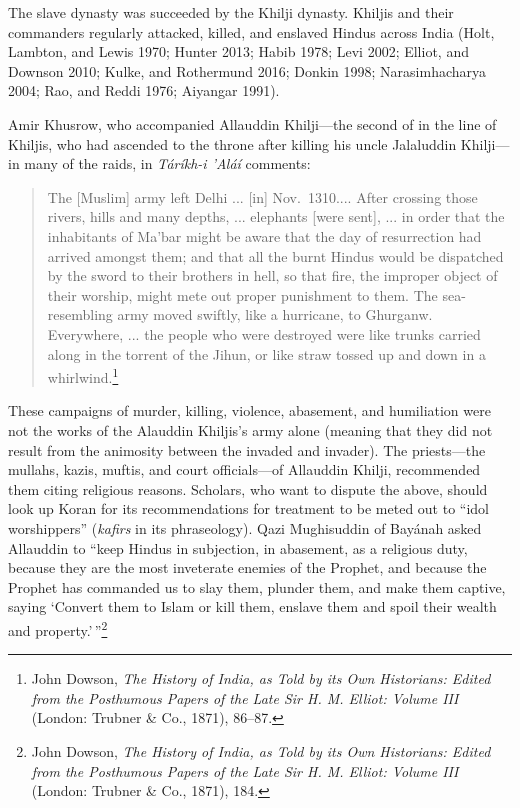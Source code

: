 The slave dynasty was succeeded by the Khilji dynasty. Khiljis and their commanders regularly attacked, killed, and enslaved Hindus across India (Holt, Lambton, and Lewis 1970; Hunter 2013; Habib 1978; Levi 2002; Elliot, and Downson 2010; Kulke, and Rothermund 2016; Donkin 1998; Narasimhacharya 2004; Rao, and Reddi 1976; Aiyangar 1991). 

Amir Khusrow, who accompanied Allauddin Khilji—the second of in the line of Khiljis, who had ascended to the throne after killing his uncle Jalaluddin Khilji—in many of the raids, in\textit{ Táríkh-i 'Aláí} comments: 
\begin{quote}
The [Muslim] army left Delhi ... [in] Nov.\ 1310.... After crossing those rivers, hills and many depths, ... elephants [were sent], ... in order that the inhabitants of Ma'bar might be aware that the day of resurrection had arrived amongst them; and that all the burnt Hindus would be dispatched by the sword to their brothers in hell, so that fire, the improper object of their worship, might mete out proper punishment to them. The sea-resembling army moved swiftly, like a hurricane, to Ghurganw. Everywhere, ... the people who were destroyed were like trunks carried along in the torrent of the Jihun, or like straw tossed up and down in a whirlwind.\footnote{John Dowson, \textit{The History of India, as Told by its Own Historians: Edited from the Posthumous Papers of the Late Sir H. M. Elliot: Volume III} (London: Trubner \& Co., 1871), 86--87.}
\end{quote}
These campaigns of murder, killing, violence, abasement, and humiliation were not the works of the Alauddin Khiljis’s army alone (meaning that they did not result from the animosity between the invaded and invader). The priests—the mullahs, kazis, muftis, and court officials—of Allauddin Khilji, recommended them citing religious reasons. Scholars, who want to dispute the above, should look up Koran for its recommendations for treatment to be meted out to “idol worshippers” (\textit{kafirs} in its phraseology). Qazi Mughisuddin of Bayánah asked Allauddin to “keep Hindus in subjection, in abasement, as a religious duty, because they are the most inveterate enemies of the Prophet, and because the Prophet has commanded us to slay them, plunder them, and make them captive, saying ‘Convert them to Islam or kill them, enslave them and spoil their wealth and property.’\,”\footnote{John Dowson, \textit{The History of India, as Told by its Own Historians: Edited from the Posthumous Papers of the Late Sir H. M. Elliot: Volume III} (London: Trubner \& Co., 1871), 184.}

